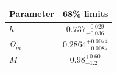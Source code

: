 \begin{tabular} { l  c}

 Parameter &  68\% limits\\
\hline
{\boldmath$h              $} & $0.737^{+0.029}_{-0.036}   $\\

{\boldmath$\Omega_m       $} & $0.2864^{+0.0074}_{-0.0087}$\\

{\boldmath$M              $} & $0.98^{+0.60}_{-1.2}       $\\
\hline
\end{tabular}